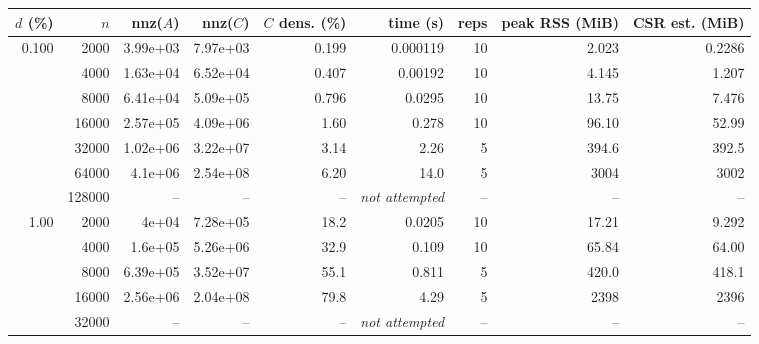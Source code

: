 \begin{tabular}{rrrrrrrrr}
\toprule
$d$ (\%) & $n$ & nnz($A$) & nnz($C$) & $C$ dens. (\%) & time (s) & reps & peak RSS (MiB) & CSR est. (MiB) \\
\midrule
0.100 & 2000 & 3.99e+03 & 7.97e+03 & 0.199 & 0.000119 & 10 & 2.023 & 0.2286 \\
 & 4000 & 1.63e+04 & 6.52e+04 & 0.407 & 0.00192 & 10 & 4.145 & 1.207 \\
 & 8000 & 6.41e+04 & 5.09e+05 & 0.796 & 0.0295 & 10 & 13.75 & 7.476 \\
 & 16000 & 2.57e+05 & 4.09e+06 & 1.60 & 0.278 & 10 & 96.10 & 52.99 \\
 & 32000 & 1.02e+06 & 3.22e+07 & 3.14 & 2.26 & 5 & 394.6 & 392.5 \\
 & 64000 & 4.1e+06 & 2.54e+08 & 6.20 & 14.0 & 5 & 3004 & 3002 \\
 & 128000 & -- & -- & -- & \emph{not attempted} & -- & -- & -- \\
\midrule
1.00 & 2000 & 4e+04 & 7.28e+05 & 18.2 & 0.0205 & 10 & 17.21 & 9.292 \\
 & 4000 & 1.6e+05 & 5.26e+06 & 32.9 & 0.109 & 10 & 65.84 & 64.00 \\
 & 8000 & 6.39e+05 & 3.52e+07 & 55.1 & 0.811 & 5 & 420.0 & 418.1 \\
 & 16000 & 2.56e+06 & 2.04e+08 & 79.8 & 4.29 & 5 & 2398 & 2396 \\
 & 32000 & -- & -- & -- & \emph{not attempted} & -- & -- & -- \\
\bottomrule
\end{tabular}
